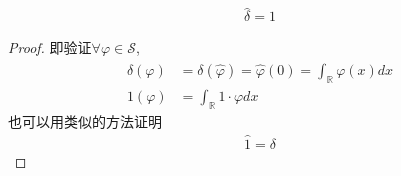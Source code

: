 \begin{proposition}
    \begin{align*}
        \widehat{\delta} = 1
    \end{align*}
\end{proposition}
\begin{proof}
    即验证$\forall \varphi\in\mathcal{S}$,
    \begin{align*}
        \widehat{\delta}(\varphi) &= \delta(\widehat{\varphi}) = \widehat{\varphi}(0) = \int_{\mathbb{R}}  \varphi(x) dx \\
        1(\varphi) &= \int_{\mathbb{R}} 1\cdot \varphi dx
    \end{align*}
    也可以用类似的方法证明
    \begin{align*}
        \widehat{1} = \delta
    \end{align*}
\end{proof}


\newpage
